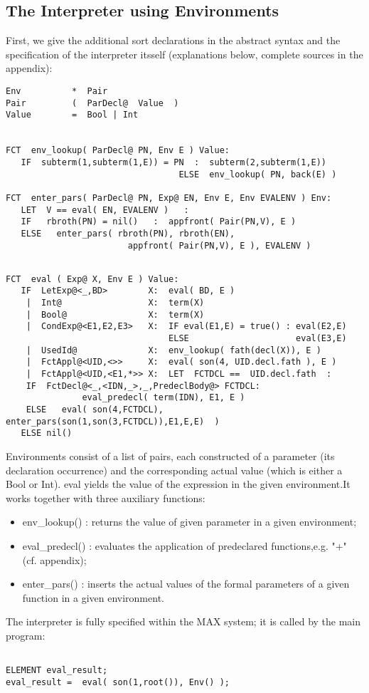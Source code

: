 \subsection{The Interpreter using Environments}
First, we give the additional sort declarations in the abstract syntax and the specification of the interpreter itsself (explanations below, complete sources in the appendix):
\begin{verbatim}
Env          *  Pair
Pair         (  ParDecl@  Value  )
Value        =  Bool | Int


FCT  env_lookup( ParDecl@ PN, Env E ) Value:
   IF  subterm(1,subterm(1,E)) = PN  :  subterm(2,subterm(1,E))
                                  ELSE  env_lookup( PN, back(E) )

FCT  enter_pars( ParDecl@ PN, Exp@ EN, Env E, Env EVALENV ) Env:
   LET  V == eval( EN, EVALENV )   :
   IF   rbroth(PN) = nil()   :	appfront( Pair(PN,V), E )
   ELSE   enter_pars( rbroth(PN), rbroth(EN), 
                        appfront( Pair(PN,V), E ), EVALENV )
\end{verbatim}
\pagebreak
\begin{verbatim}

FCT  eval ( Exp@ X, Env E ) Value:
   IF  LetExp@<_,BD>        X:  eval( BD, E )
    |  Int@                 X:  term(X)
    |  Bool@                X:  term(X)
    |  CondExp@<E1,E2,E3>   X:  IF eval(E1,E) = true() : eval(E2,E)
                                ELSE                     eval(E3,E) 
    |  UsedId@              X:  env_lookup( fath(decl(X)), E )
    |  FctAppl@<UID,<>>     X:  eval( son(4, UID.decl.fath ), E )
    |  FctAppl@<UID,<E1,*>> X:  LET  FCTDCL ==  UID.decl.fath  :
	IF  FctDecl@<_,<IDN,_>,_,PredeclBody@> FCTDCL:  
               eval_predecl( term(IDN), E1, E )
	ELSE   eval( son(4,FCTDCL), enter_pars(son(1,son(3,FCTDCL)),E1,E,E)  )
   ELSE nil()

\end{verbatim}
Environments consist of a list of pairs, each constructed of a parameter (its declaration occurrence) and the corresponding actual value (which is either a Bool or Int).
eval yields the value of the expression in the given environment.It works together with three auxiliary functions:
\begin{itemize}
\item env\_lookup() : returns the value of given parameter in a given environment;
\item eval\_predecl() : evaluates the application of predeclared functions,e.g. "+" (cf. appendix);
\item enter\_pars() : inserts the actual values of the formal parameters of a given function in a given environment.
\end{itemize}
\noindent
The interpreter is fully specified within the MAX system; it is called by the main program:
\begin{verbatim}

ELEMENT eval_result;            
eval_result =  eval( son(1,root()), Env() );
                
\end{verbatim}

